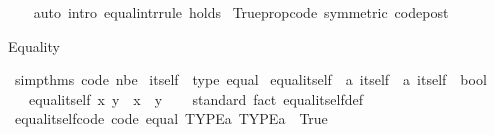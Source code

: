 \begin{isabellebody}
\ \ %
\endisadelimproof
%
\isatagproof
{}\isamarkupfalse%
\ {\isacharparenleft}{\kern0pt}auto\ intro{\isacharbang}{\kern0pt}{\isacharcolon}{\kern0pt}\ equal{\isacharunderscore}{\kern0pt}intr{\isacharunderscore}{\kern0pt}rule\ holds{\isacharparenright}{\kern0pt}%
\endisatagproof
{\isafoldproof}%
%
\isadelimproof
\isanewline
%
\endisadelimproof
\isanewline
{}\isamarkupfalse%
\ Trueprop{\isacharunderscore}{\kern0pt}code\ {\isacharbrackleft}{\kern0pt}symmetric{\isacharcomma}{\kern0pt}\ code{\isacharunderscore}{\kern0pt}post{\isacharbrackright}{\kern0pt}%
\begin{isamarkuptext}%
Equality%
\end{isamarkuptext}\isamarkuptrue%
\isamarkupfalse%
\ simp{\isacharunderscore}{\kern0pt}thms{\isacharparenleft}{\kern0pt}{}{\isacharparenright}{\kern0pt}\ {\isacharbrackleft}{\kern0pt}code\ nbe{\isacharbrackright}{\kern0pt}\isanewline
\isanewline
{}\isamarkupfalse%
\ itself\ {\isacharcolon}{\kern0pt}{\isacharcolon}{\kern0pt}\ {\isacharparenleft}{\kern0pt}type{\isacharparenright}{\kern0pt}\ equal\isanewline
{}\isanewline
\isanewline
{}\isamarkupfalse%
\ equal{\isacharunderscore}{\kern0pt}itself\ {\isacharcolon}{\kern0pt}{\isacharcolon}{\kern0pt}\ {\isachardoublequoteopen}{\isacharprime}{\kern0pt}a\ itself\ {\isasymRightarrow}\ {\isacharprime}{\kern0pt}a\ itself\ {\isasymRightarrow}\ bool{\isachardoublequoteclose}\isanewline
\ \ \ {\isachardoublequoteopen}equal{\isacharunderscore}{\kern0pt}itself\ x\ y\ {\isasymlongleftrightarrow}\ x\ {\isacharequal}{\kern0pt}\ y{\isachardoublequoteclose}\isanewline
\isanewline
{}\isamarkupfalse%
\isanewline
%
\isadelimproof
\ \ %
\endisadelimproof
%
\isatagproof
{}\isamarkupfalse%
\ standard\ {\isacharparenleft}{\kern0pt}fact\ equal{\isacharunderscore}{\kern0pt}itself{\isacharunderscore}{\kern0pt}def{\isacharparenright}{\kern0pt}%
\endisatagproof
{\isafoldproof}%
%
\isadelimproof
\isanewline
%
\endisadelimproof
\isanewline
{}\isamarkupfalse%
\isanewline
\isanewline
{}\isamarkupfalse%
\ equal{\isacharunderscore}{\kern0pt}itself{\isacharunderscore}{\kern0pt}code\ {\isacharbrackleft}{\kern0pt}code{\isacharbrackright}{\kern0pt}{\isacharcolon}{\kern0pt}\ {\isachardoublequoteopen}equal\ TYPE{\isacharparenleft}{\kern0pt}{\isacharprime}{\kern0pt}a{\isacharparenright}{\kern0pt}\ TYPE{\isacharparenleft}{\kern0pt}{\isacharprime}{\kern0pt}a{\isacharparenright}{\kern0pt}\ {\isasymlongleftrightarrow}\ True{\isachardoublequoteclose}\isanewline

\end{isabellebody}
